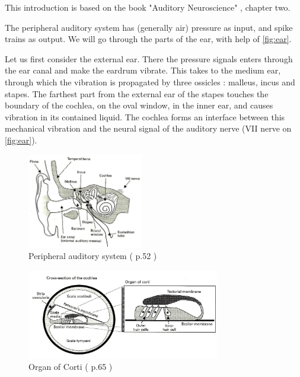  This introduction is based on the book "Auditory Neuroscience" 
\cite{AuditoryNeuroscience}, chapter two.

The peripheral auditory system has (generally air) pressure as input, 
and spike trains as output. We will go through the parts of the ear, with help 
of \autoref{fig:ear}.

Let us first consider the external ear. There the pressure signals enters through
 the ear canal and make the eardrum vibrate. 
This takes to the medium ear, through which 
the vibration is propagated by three ossicles : malleus, incus 
and stapes. The farthest part from the external ear of the stapes touches the 
boundary of the cochlea, on the oval window, in the inner ear, 
and causes vibration in its contained liquid. 
The cochlea forms an interface between this mechanical vibration 
and the neural signal of the auditory nerve 
(VII nerve on \autoref{fig:ear}).


\begin{figure}[h]
	\centering
	\includegraphics[width=0.45\textwidth]{images/ear2-aud52-level.jpg}
	\caption{Peripheral auditory system (\cite{AuditoryNeuroscience} p.52 )}
	\label{fig:ear}
\end{figure}

\begin{figure}[ht]
	\centering
  \includegraphics[width=0.75\textwidth]{images/corti2-aud65-level.jpg}
	\caption{Organ of Corti (\cite{AuditoryNeuroscience} p.65 )}
	\label{fig:corti}
\end{figure}


